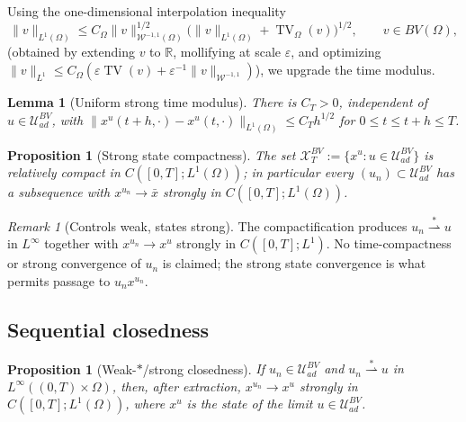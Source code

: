 \documentclass[pdflatex,sn-mathphys-num]{sn-jnl}
\newcommand{\R}{\mathbb{R}}
\newcommand{\Om}{\Omega}
\newcommand{\UadBV}{\mathcal{U}_{ad}^{BV}}
\DeclareMathOperator{\TV}{TV}
\theoremstyle{plain}
\newtheorem{proposition}[theorem]{Proposition}
\newtheorem{lemma}[theorem]{Lemma}
\theoremstyle{definition}
\theoremstyle{remark}
\newtheorem{remark}[theorem]{Remark}
\begin{document}
Using the one-dimensional interpolation inequality
\begin{equation}\label{eq:BV_interpolation}
\|v\|_{L^1(\Om)}
\le
C_\Om\|v\|_{\mathcal W^{-1,1}(\Om)}^{1/2}
\big(\|v\|_{L^1(\Om)}+\TV_\Om(v)\big)^{1/2},
\qquad v\in BV(\Om),
\end{equation}
(obtained by extending $v$ to $\R$, mollifying at scale $\varepsilon$, and
optimizing $\|v\|_{L^1}\le C_\Om(\varepsilon\TV(v)+\varepsilon^{-1}\|v\|_{\mathcal W^{-1,1}})$),
we upgrade the time modulus.

\begin{lemma}[Uniform strong time modulus]
\label{lem:strong_time_modulus}
There is $C_T>0$, independent of $u\in\UadBV$, with
$\|x^u(t+h,\cdot)-x^u(t,\cdot)\|_{L^1(\Om)}\le C_T h^{1/2}$ for
$0\le t\le t+h\le T$.
\end{lemma}

\begin{proposition}[Strong state compactness]
\label{prop:strong_state_compactness}
The set $\mathcal X_T^{BV}:=\{x^u:u\in\UadBV\}$ is relatively compact in
$C([0,T];L^1(\Om))$; in particular every $(u_n)\subset\UadBV$ has a subsequence
with $x^{u_n}\to\bar x$ strongly in $C([0,T];L^1(\Om))$.
\end{proposition}

\begin{remark}[Controls weak, states strong]
\label{rmk:weak_control_strong_state}
The compactification produces
$u_n\overset{\ast}{\rightharpoonup}u$ in $L^\infty$ together with
$x^{u_n}\to x^u$ strongly in $C([0,T];L^1)$. No time-compactness or strong
convergence of $u_n$ is claimed; the strong state convergence is what permits
passage to $u_nx^{u_n}$.
\end{remark}

\subsection{Sequential closedness}
\label{subsec:closed_control_state}

\begin{proposition}[Weak-$\ast$/strong closedness]
\label{prop:control_state_closed}
If $u_n\in\UadBV$ and $u_n\overset{\ast}{\rightharpoonup}u$ in
$L^\infty((0,T)\times\Om)$, then, after extraction, $x^{u_n}\to x^u$ strongly in
$C([0,T];L^1(\Om))$, where $x^u$ is the state of the limit $u\in\UadBV$.
\end{proposition}
\end{document}
